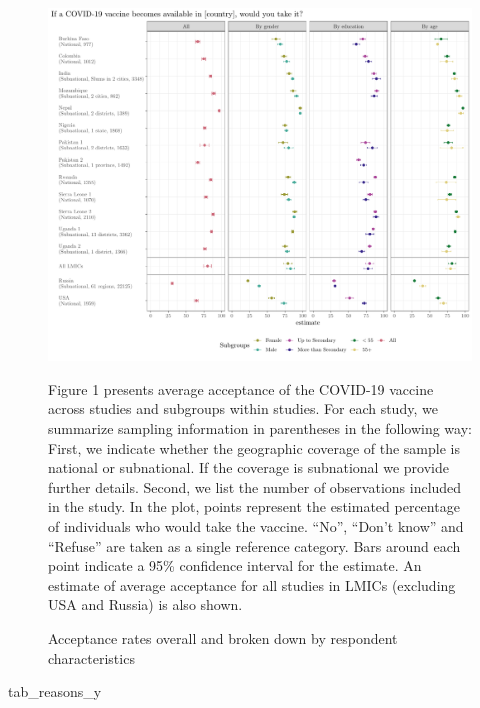\documentclass[
  12pt,
]{article}
\newenvironment{Shaded}{\begin{snugshade}}{\end{snugshade}}
\newcommand{\NormalTok}[1]{#1}
\begin{document}
\begin{landscape}
\begin{table}[!h]
{\begin{threeparttable}
\begin{tablenotes}
\end{tablenotes}
\end{threeparttable}}
\end{table}
\end{landscape}

\begin{figure}[!ht]
\caption{Acceptance rates overall and broken down by respondent characteristics \label{fig:mainfigure1}}

\includegraphics{paper_files/figure-latex/mainfigure1-1.pdf}

\scriptsize{Figure 1 presents average acceptance of the COVID-19 vaccine across studies and subgroups within studies. For each study, we summarize sampling information in parentheses in the following way: First, we indicate whether the geographic coverage of the sample is national or subnational. If the coverage is subnational we provide further details. Second, we list the number of observations included in the study. In the plot, points represent the estimated percentage of individuals who would take the vaccine. ``No'', ``Don't know'' and ``Refuse'' are taken as a single reference category. Bars around each point indicate a 95\% confidence interval for the estimate. An estimate of average acceptance for all studies in LMICs (excluding USA and Russia) is also shown.}
\end{figure}

\begin{Shaded}
\begin{Highlighting}[]
\NormalTok{tab\_reasons\_y}
\end{Highlighting}
\end{Shaded}
\end{document}
